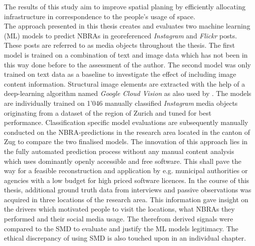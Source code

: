 The results of this study aim to improve spatial planing by efficiently allocating infrastructure in correspondence to the people's usage of space.\\
\newline
The approach presented in this thesis creates and evaluates two machine learning (ML) models to predict NBRAs in georeferenced \textit{Instagram} and \textit{Flickr} posts. These posts are referred to as media objects throughout the thesis. The first model is trained on a combination of text and image data which has not been in this way done before to the assessment of the author. The second model was only trained on text data as a baseline to investigate the effect of including image content information. Structural image elements are extracted with the help of a deep-learning algorithm named \textit{Google Cloud Vision} as also used by \parencite{Richards2018}. The models are individually trained on 1'046 manually classified \textit{Instagram} media objects originating from a dataset of the region of Zurich \parencite{XY} and tuned for best performance. Classification specific model evaluations are subsequently manually conducted on the NBRA-predictions in the research area located in the canton of Zug to compare the two finalised models. The innovation of this approach lies in the fully automated prediction process without any manual content analysis which uses dominantly openly accessible and free software. This shall pave the way for a feasible reconstruction and application by e.g. municipal authorities or agencies with a low budget for high priced software licences.
\newline
In the course of this thesis, additional ground truth data from interviews and passive observations was acquired in three locations of the research area. This information gave insight on the drivers which motivated people to visit the locations, what NBRAs they performed and their social media usage. The therefrom derived signals were compared to the SMD \parencite{Wartmann2018} to evaluate and justify the ML models legitimacy. The ethical discrepancy of using SMD is also touched upon in an individual chapter.
